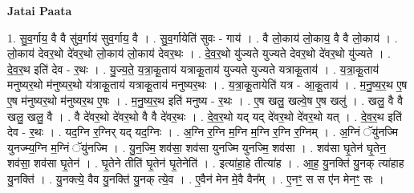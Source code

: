 \documentclass[17pt]{extarticle}
\begin{document}
\textbf{Jatai Paata} \newline

1. सु॒व॒र्गाय॒ वै वै सु॑व॒र्गाय॑ सुव॒र्गाय॒ वै । . सु॒व॒र्गायेति॑ सुवः - गाय॑ । . वै लो॒काय॑ लो॒काय॒ वै वै लो॒काय॑ । . लो॒काय॑ देवर॒थो दे॑वर॒थो लो॒काय॑ लो॒काय॑ देवर॒थः । . दे॒व॒र॒थो यु॑ज्यते युज्यते देवर॒थो दे॑वर॒थो यु॑ज्यते । . दे॒व॒र॒थ इति॑ देव - र॒थः । . यु॒ज्य॒ते॒ य॒त्रा॒कू॒ताय॑ यत्राकू॒ताय॑ युज्यते युज्यते यत्राकू॒ताय॑ । . य॒त्रा॒कू॒ताय॑ मनुष्यर॒थो म॑नुष्यर॒थो य॑त्राकू॒ताय॑ यत्राकू॒ताय॑ मनुष्यर॒थः । . य॒त्रा॒कू॒तायेति॑ यत्र - आ॒कू॒ताय॑ । . म॒नु॒ष्य॒र॒थ ए॒ष ए॒ष म॑नुष्यर॒थो म॑नुष्यर॒थ ए॒षः । . म॒नु॒ष्य॒र॒थ इति॑ मनुष्य - र॒थः । . ए॒ष खलु॒ खल्वे॒ष ए॒ष खलु॑ । . खलु॒ वै वै खलु॒ खलु॒ वै । . वै दे॑वर॒थो दे॑वर॒थो वै वै दे॑वर॒थः । . दे॒व॒र॒थो यद् यद् दे॑वर॒थो दे॑वर॒थो यत् । . दे॒व॒र॒थ इति॑ देव - र॒थः । . यद॒ग्नि र॒ग्निर् यद् यद॒ग्निः । . अ॒ग्नि र॒ग्नि म॒ग्नि म॒ग्नि र॒ग्नि र॒ग्निम् । . अ॒ग्निं ॅयु॑नज्मि युनज्म्य॒ग्नि म॒ग्निं ॅयु॑नज्मि । . यु॒न॒ज्मि॒ शव॑सा॒ शव॑सा युनज्मि युनज्मि॒ शव॑सा । . शव॑सा घृ॒तेन॑ घृ॒तेन॒ शव॑सा॒ शव॑सा घृ॒तेन॑ । . घृ॒तेने तीति॑ घृ॒तेन॑ घृ॒तेनेति॑ । . इत्या॑हा॒हे तीत्या॑ह । . आ॒ह॒ यु॒नक्ति॑ यु॒नक् त्या॑हाह यु॒नक्ति॑ । . यु॒नक्त्ये॒ वैव यु॒नक्ति॑ यु॒नक् त्ये॒व । . ए॒वैन॑ मेन मे॒वै वैन᳚म् । . ए॒नꣳ॒॒ स स ए॑न मेनꣳ॒॒ सः । \newline
\end{document}

